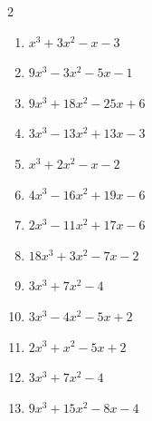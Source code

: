 \begin{multicols}{2}
\begin{enumerate}
        \phantom{$=(x+1)(x+2)(x-2)$}

  \item $x^{3}+3x^{2}-x-3$

        \phantom{$=(x+1)(x+3)(x-1)$}

  \item $9x^{3}-3x^{2}-5x-1$


  \item $9x^{3}+18x^{2}-25x+6$

        \phantom{$=(3x-1)(3x-2)(x+3)$}

\columnbreak %

\resetques

  \item $3x^{3}-13x^{2}+13x-3$

        \phantom{$=(3x-1)(x-1)(x-3)$}

  \item $x^{3}+2x^{2}-x-2$

        \phantom{$=(x+1)(x+2)(x-1)$}

  \item $4x^{3}-16x^{2}+19x-6$

        \phantom{$=(2x-1)(2x-3)(x-2)$}

  \item $2x^{3}-11x^{2}+17x-6$

        \phantom{$=(2x-1)(x-2)(x-3)$}

  \item $18x^{3}+3x^{2}-7x-2$

        \phantom{$=(2x+1)(3x+1)(3x-2)$}

\columnbreak %

  \item $3x^{3}+7x^{2}-4$

        \phantom{$=(3x-2)(x+1)(x+2)$}

  \item $3x^{3}-4x^{2}-5x+2$

        \phantom{$=(3x-1)(x+1)(x-2)$}

  \item $2x^{3}+x^{2}-5x+2$

        \phantom{$=(2x-1)(x+2)(x-1)$}

  \item $3x^{3}+7x^{2}-4$

        \phantom{$=(3x-2)(x+1)(x+2)$}

  \item $9x^{3}+15x^{2}-8x-4$


\end{enumerate}
\end{multicols}
